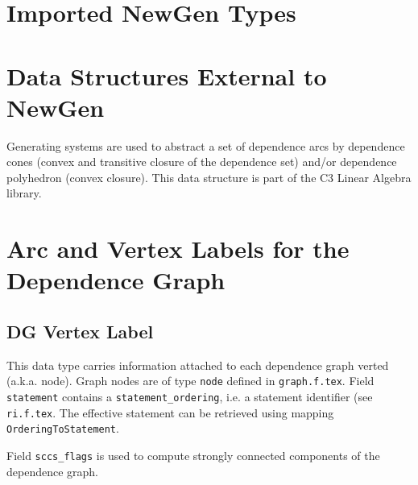 \section{Imported NewGen Types}

\iffalse
\domain{Import statement from "ri.newgen"}
{}
\fi

{}

{}

\section{Data Structures External to NewGen}

Generating systems are used to abstract a set of dependence arcs by
dependence cones (convex and transitive closure of the dependence set)
and/or dependence polyhedron (convex closure). This data structure is
part of the C3 Linear Algebra library.


\section{Arc and Vertex Labels for the Dependence Graph}

\subsection{DG Vertex Label}

{}

This data type carries information attached to each dependence graph
verted (a.k.a. node). Graph nodes are of type \verb/node/ defined in
{\tt graph.f.tex}.  Field \verb/statement/ contains a
\verb/statement_ordering/, i.e. a statement identifier (see {\tt
ri.f.tex}. The effective statement can be retrieved using mapping
\verb/OrderingToStatement/.

Field \verb/sccs_flags/ is used to compute strongly connected components
of the dependence graph.

\iffalse
Ce domaine est utilise' pour contenir les informations qui sont
attache'es a` chaque noeud du graphe de de'pendances (voir le domaine
{\tt graph} dans le fichier {\tt graph.f.tex}). Le sous-domaine {\tt
statement} permet de retrouver l'instruction qui porte la de'pendance;
cet entier est le champ {\tt ordering} de l'instruction concerne'e. Le
sous-domaine {\tt sccflags} contient diverses informations utiles pour
le calcul des composantes fortement connexes.
\fi

